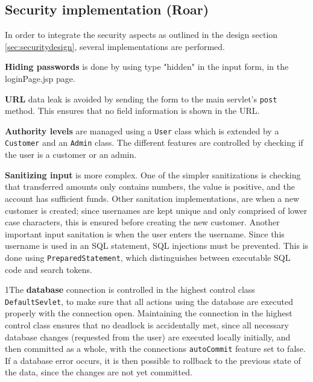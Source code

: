 \subsection{Security implementation (Roar)}

In order to integrate the security aspects as outlined in the design section \ref{sec:securitydesign}, several implementations are performed. 

\textbf{Hiding passwords} is done by using type "hidden" in the input form, in the loginPage.jsp page. 

\textbf{URL} data leak is avoided by sending the form to the main servlet's \texttt{post} method. This ensures that no field information is shown in the URL.

\textbf{Authority levels} are managed using a \texttt{User} class which is extended by a \texttt{Customer} and an \texttt{Admin} class. The different features are controlled by checking if the user is a customer or an admin. 

\textbf{Sanitizing input} is more complex. One of the simpler sanitizations is checking that transferred amounts only contains numbers, the value is positive, and the account has sufficient funds. Other sanitation implementations, are when a new customer is created; since usernames are kept unique and only comprised of lower case characters, this is ensured before creating the new customer. Another important input sanitation is when the user enters the username. Since this username is used in an SQL statement, SQL injections must be prevented. This is done using \texttt{PreparedStatement}, which distinguishes between executable SQL code and search tokens.

1The \textbf{database} connection is controlled in the highest control class \texttt{DefaultSevlet}, to make sure that all actions using the database are executed properly with the connection open. Maintaining the connection in the highest control class ensures that no deadlock is accidentally met, since all necessary database changes (requested from the user) are executed locally initially, and then committed as a whole, with the connections \texttt{autoCommit} feature set to false. If a database error occurs, it is then possible to rollback to the previous state of the data, since the changes are not yet committed. 